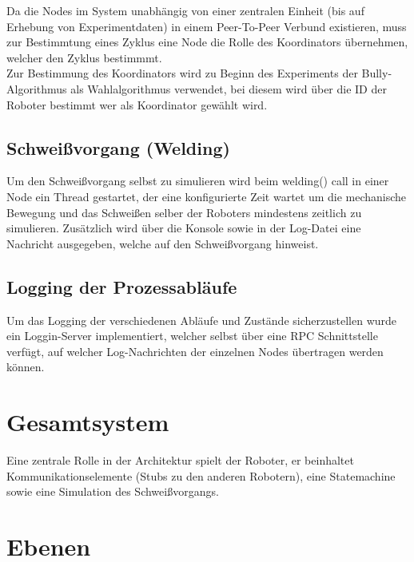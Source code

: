 Da die Nodes im System unabhängig von einer zentralen Einheit (bis auf Erhebung von Experimentdaten)
in einem Peer-To-Peer \citep{tanenbaumvansteen} Verbund existieren, muss zur Bestimmtung 
eines Zyklus eine Node die Rolle des Koordinators \citep{tanenbaumvansteen} übernehmen, welcher den Zyklus bestimmmt.\\
Zur Bestimmung des Koordinators wird zu Beginn des Experiments der Bully-Algorithmus \citep{tanenbaumvansteen}
als Wahlalgorithmus verwendet, bei diesem wird über die ID der Roboter bestimmt wer als
Koordinator gewählt wird.

\subsection{Schweißvorgang (Welding)}

Um den Schweißvorgang selbst zu simulieren wird beim welding() call in einer Node ein Thread gestartet,
der eine konfigurierte Zeit wartet um die mechanische Bewegung und das Schweißen selber der Roboters
mindestens zeitlich zu simulieren. Zusätzlich wird über die Konsole sowie in der Log-Datei eine Nachricht
ausgegeben, welche auf den Schweißvorgang hinweist.

\subsection{Logging der Prozessabläufe}

Um das Logging der verschiedenen Abläufe und Zustände sicherzustellen wurde ein Loggin-Server implementiert,
welcher selbst über eine RPC Schnittstelle verfügt, auf welcher Log-Nachrichten der einzelnen Nodes übertragen
werden können.

\section{Gesamtsystem}



Eine zentrale Rolle in der Architektur spielt der Roboter, er beinhaltet Kommunikationselemente (Stubs 
\citep{tanenbaumvansteen} zu den anderen Robotern), eine Statemachine sowie eine Simulation des
Schweißvorgangs.

\section{Ebenen}
